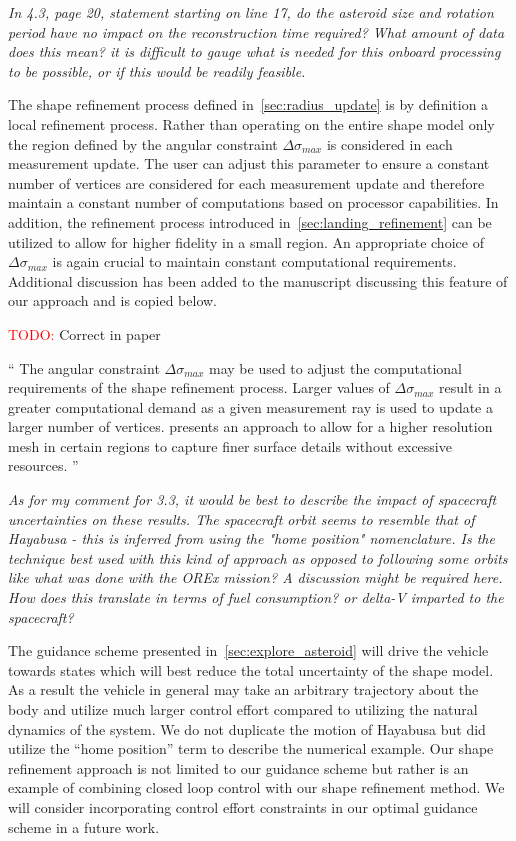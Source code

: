 \documentclass[11pt]{article}
\newcommand{\todo}{{\large \textcolor{red}{TODO: }}}
\newenvironment{correction}{\begin{list}{}{\setlength{\leftmargin}{1cm}\setlength{\rightmargin}{1cm}}\vspace{\parsep}\item[]``}{''\end{list}}
\newcommand{\comment}[1]{\item \itshape #1 \normalfont}
\begin{document}
\begin{itemize}
\comment{
In 4.3, page 20, statement starting on line 17, do the asteroid size and rotation period have no impact on the reconstruction time required? 
What amount of data does this mean? 
it is difficult to gauge what is needed for this onboard processing to be possible, or if this would be readily feasible.
}

The shape refinement process defined in~\cref{sec:radius_update} is by definition a local refinement process.
Rather than operating on the entire shape model only the region defined by the angular constraint \( \Delta \sigma_{max}\) is considered in each measurement update. 
The user can adjust this parameter to ensure a constant number of vertices are considered for each measurement update and therefore maintain a constant number of computations based on processor capabilities. 
In addition, the refinement process introduced in~\cref{sec:landing_refinement} can be utilized to allow for higher fidelity in a small region.
An appropriate choice of \( \Delta \sigma_{max} \) is again crucial to maintain constant computational requirements.
Additional discussion has been added to the manuscript discussing this feature of our approach and is copied below.

\todo Correct in paper

\begin{correction}
    The angular constraint \( \Delta \sigma_{max} \) may be used to adjust the computational requirements of the shape refinement process.
    Larger values of \( \Delta \sigma_{max} \) result in a greater computational demand as a given measurement ray is used to update a larger number of vertices.
     presents an approach to allow for a higher resolution mesh in certain regions to capture finer surface details without excessive resources. 
\end{correction}

\comment{
As for my comment for 3.3, it would be best to describe the impact of spacecraft uncertainties on these results.
The spacecraft orbit seems to resemble that of Hayabusa - this is inferred from using the "home position" nomenclature. 
Is the technique best used with this kind of approach as opposed to following some orbits like what was done with the OREx mission? A discussion might be required here.
How does this translate in terms of fuel consumption? or delta-V imparted to the spacecraft?  
}

The guidance scheme presented in~\cref{sec:explore_asteroid} will drive the vehicle towards states which will best reduce the total uncertainty of the shape model.
As a result the vehicle in general may take an arbitrary trajectory about the body and utilize much larger control effort compared to utilizing the natural dynamics of the system. 
We do not duplicate the motion of Hayabusa but did utilize the ``home position'' term to describe the numerical example.
Our shape refinement approach is not limited to our guidance scheme but rather is an example of combining closed loop control with our shape refinement method.
We will consider incorporating control effort constraints in our optimal guidance scheme in a future work.


\end{itemize}
\end{document}
